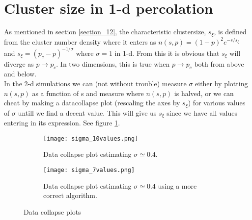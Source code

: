 \documentclass[a4paper,english, 10pt, twoside]{article}
\begin{document}
\section{Cluster size in 1-d percolation}
As mentioned in section \ref{section_12}, the characteristic clustersize, $s_\xi$, is defined from the cluster number density where 
it enters as $n(s,p) = (1-p)^2e^{-s/s_\xi}$ and $s_\xi = (p_c-p)^{-1/\sigma}$ where $\sigma=1$ in 1-d. From this it is obvious that $s_\xi$ 
will diverge as $p\to p_c$. In two dimensions, this is true when $p\to p_c$ both from above and below. \\
In the 2-d simulations we can (not without trouble) measure $\sigma$ either by plotting $n(s,p)$ as a function of s and measure where 
$n(s,p)$ is halved, or we can cheat by making a datacollapse plot (rescaling the axes by $s_\xi$) for various values of $\sigma$ untill 
we find a decent value. This will give us $s_\xi$ since we have all values entering in its expression. See figure \ref{sigma}.
\begin{figure}[H]
\centering
\begin{subfigure}[b]{\textwidth}
\texttt{[image: sigma\_10values.png]}
\caption{Data collapse plot estimating $\sigma \simeq 0.4$.}
\end{subfigure}

\begin{subfigure}[b]{0.9\textwidth}
 \texttt{[image: sigma\_7values.png]}
 \caption{Data collapse plot estimating $\sigma \simeq 0.4$ using a more correct algorithm.}
\end{subfigure}
\caption{Data collapse plots}
\label{sigma}
\end{figure}
\end{document}
